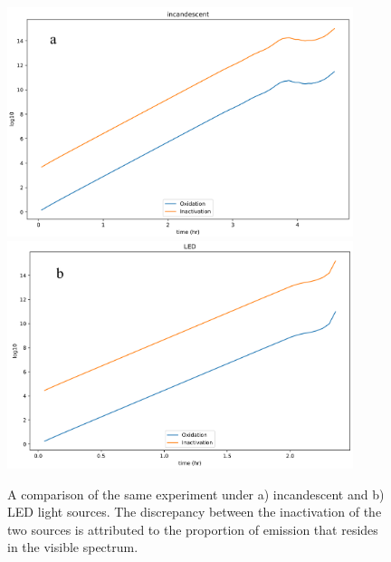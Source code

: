 \begin{figure}
    \centering
    \includegraphics[width = 0.9\textwidth]{images/PDIpy/sensitivity_analyses/light_source/incandescent.png} \\
    \vspace{5mm}
    \midrule
    \vspace{5mm}
    \includegraphics[width = 0.9\textwidth]{images/PDIpy/sensitivity_analyses/light_source/LED.png}
    \caption{
        A comparison of the same experiment under a) incandescent and b) LED light sources. The discrepancy between the inactivation of the two sources is attributed to the proportion of emission that resides in the visible spectrum.
    }
    \label{light_source}
\end{figure}


